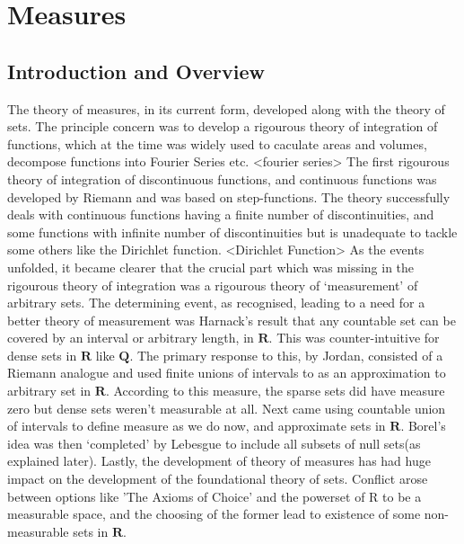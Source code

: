 \chapter{Measures} %

\label{Chapter3} %



\section{Introduction and Overview}
The theory of measures, in its current form, developed along with the theory of
sets.
The principle concern was to develop a rigourous theory of integration of
functions, which at the time was widely used to caculate areas and volumes,
decompose functions into Fourier Series etc.
<fourier series>
\newline
The first rigourous theory of integration of discontinuous functions, and
continuous functions was developed by Riemann and was based on step-functions.
The theory successfully deals with continuous functions having a finite number
of discontinuities, and some functions with infinite number of discontinuities
but is unadequate to tackle some others like the Dirichlet function.
<Dirichlet Function>
\newline
As the events unfolded, it became clearer that the crucial part which was
missing in the rigourous theory of integration was a rigourous theory of
`measurement' of arbitrary sets.
\newline
The determining event, as recognised, leading to a need for a better theory of
measurement was Harnack's result that any countable set can be covered by an
interval or arbitrary length, in $\bm{R}$. This was counter-intuitive for dense
sets in $\bm{R}$ like $\bm{Q}$.
\newline
The primary response to this, by Jordan, consisted of a Riemann analogue and
used finite unions of intervals to as an approximation to arbitrary set in
$\bm{R}$.
According to this measure, the sparse sets did have measure zero but dense sets
weren't measurable at all.
\newline
Next came using countable union of intervals to define measure as we do now, and
approximate sets in $\bm{R}$. Borel's idea was then `completed' by Lebesgue to
include all subsets of null sets(as explained later).
\newline
Lastly, the development of theory of measures has had huge impact on the
development of the foundational theory of sets. Conflict arose between options
like 'The Axioms of Choice' and the powerset of R to be a measurable space, and
the choosing of the former lead to existence of some non-measurable sets in
$\bm{R}$.

